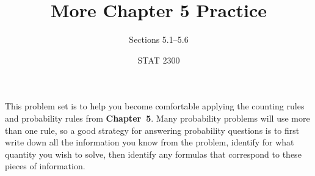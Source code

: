 \documentclass[noanswers]{exam}
\title{More Chapter 5 Practice}
\author{Sections 5.1--5.6}
\date{STAT 2300}
\begin{document}
%

\noindent This problem set is to help you become comfortable applying the counting rules and probability rules from \textbf{Chapter~5}. Many probability problems will use more than one rule, so a good strategy for answering probability questions is to first write down all the information you know from the problem, identify for what quantity you wish to solve, then identify any formulas that correspond to these pieces of information.



\vspace{3mm}
\end{document}
